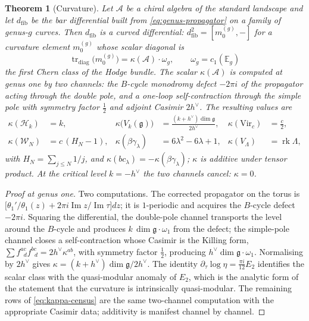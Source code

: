 \documentclass[11pt]{amsart}
\numberwithin{equation}{section}
\theoremstyle{plain}
\newtheorem{theorem}{Theorem}[section]
\theoremstyle{definition}
\theoremstyle{remark}
\newcommand{\cA}{\mathcal{A}}
\newcommand{\cW}{\mathcal{W}}
\newcommand{\fg}{\mathfrak{g}}
\newcommand{\Vir}{\mathrm{Vir}}
\newcommand{\dvee}{h^{\vee}}
\newcommand{\Dfib}{d_{\mathrm{fib}}}
\newcommand{\bE}{\mathbb{E}}
\begin{document}
\begin{theorem}[Curvature]\label{thm:curvature}
Let $\cA$ be a chiral algebra of the standard landscape and let
$\Dfib$ be the bar differential built from \eqref{eq:genus-propagator} on
a family of genus-$g$ curves. Then $\Dfib$ is a curved differential:
$\Dfib^{2}=[m_0^{(g)},-]$ for a curvature element $m_0^{(g)}$ whose
scalar diagonal is
\begin{equation}
\operatorname{tr}_{\mathrm{diag}}\bigl(m_0^{(g)}\bigr)
=\kappa(\cA)\cdot\omega_g,
\qquad \omega_g=c_1(\bE_g)
\end{equation}
the first Chern class of the Hodge bundle. The scalar $\kappa(\cA)$ is
computed at genus one by two channels: the $B$-cycle monodromy defect
$-2\pi i$ of the propagator acting through the double pole, and a one-loop
self-contraction through the simple pole with symmetry factor $\tfrac12$
and adjoint Casimir $2\dvee$. The resulting values are
\begin{equation}\label{eq:kappa-census}
\begin{aligned}
\kappa(\mathcal{H}_k)&=k, &
\kappa\bigl(V_k(\fg)\bigr)&=\frac{(k+\dvee)\dim\fg}{2\dvee}, &
\kappa(\Vir_c)&=\tfrac{c}{2},\\
\kappa(\cW_N)&=c\,(H_N-1), &
\kappa(\beta\gamma_\lambda)&=6\lambda^{2}-6\lambda+1, &
\kappa(V_\Lambda)&=\operatorname{rk}\Lambda,
\end{aligned}
\end{equation}
with $H_N=\sum_{j\leq N}1/j$, and $\kappa(bc_\lambda)=-\kappa(\beta\gamma_\lambda)$;
$\kappa$ is additive under tensor product. At the critical level
$k=-\dvee$ the two channels cancel: $\kappa=0$.
\end{theorem}

\begin{proof}[Proof at genus one]
Two computations. The corrected propagator on the torus is
$\bigl[\theta_1'/\theta_1(z)+2\pi i\operatorname{Im}z/
\operatorname{Im}\tau\bigr]dz$; it is $1$-periodic and acquires the
$B$-cycle defect $-2\pi i$. Squaring the differential, the double-pole
channel transports the level around the $B$-cycle and produces
$k\,\dim\fg\cdot\omega_1$ from the defect; the simple-pole channel
closes a self-contraction whose Casimir is the Killing form,
$\sum f^{ac}_{\;\;d}f^{bc}_{\;\;d}=2\dvee\kappa^{ab}$, with symmetry
factor $\tfrac12$, producing $\dvee\dim\fg\cdot\omega_1$. Normalising
by $2\dvee$ gives $\kappa=(k+\dvee)\dim\fg/2\dvee$. The identity
$\partial_\tau\log\eta=\tfrac{\pi i}{12}E_2$ identifies the scalar
class with the quasi-modular anomaly of $E_2$, which is the analytic
form of the statement that the curvature is intrinsically
quasi-modular.
The remaining rows of \eqref{eq:kappa-census} are the same two-channel
computation with the appropriate Casimir data; additivity is manifest
channel by channel.
\end{proof}
\end{document}
